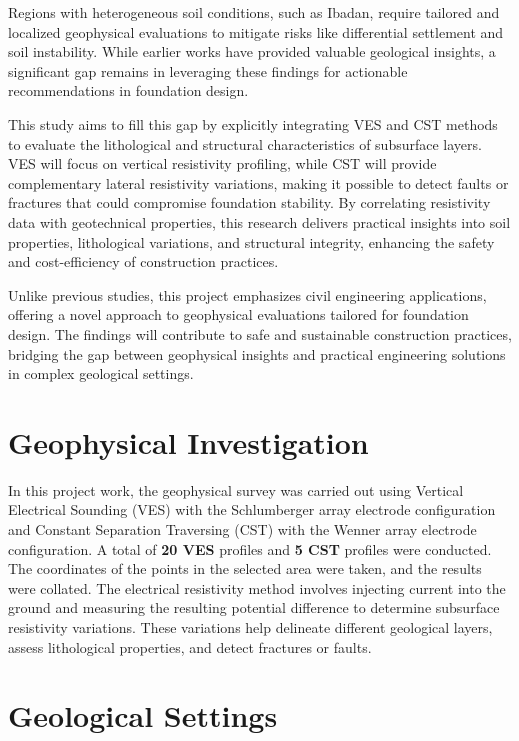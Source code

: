 \documentclass[12pt,a4paper]{report}
\begin{document}
Regions with heterogeneous soil conditions, such as Ibadan, require tailored and localized geophysical evaluations to mitigate risks like differential settlement and soil instability. While earlier works have provided valuable geological insights, a significant gap remains in leveraging these findings for actionable recommendations in foundation design.

This study aims to fill this gap by explicitly integrating VES and CST methods to evaluate the lithological and structural characteristics of subsurface layers. VES will focus on vertical resistivity profiling, while CST will provide complementary lateral resistivity variations, making it possible to detect faults or fractures that could compromise foundation stability. By correlating resistivity data with geotechnical properties, this research delivers practical insights into soil properties, lithological variations, and structural integrity, enhancing the safety and cost-efficiency of construction practices.

Unlike previous studies, this project emphasizes civil engineering applications, offering a novel approach to geophysical evaluations tailored for foundation design. The findings will contribute to safe and sustainable construction practices, bridging the gap between geophysical insights and practical engineering solutions in complex geological settings.

\section{Geophysical Investigation}
In this project work, the geophysical survey was carried out using Vertical Electrical Sounding (VES) with the Schlumberger array electrode configuration and Constant Separation Traversing (CST) with the Wenner array electrode configuration. A total of \textbf{20 VES} profiles and \textbf{5 CST} profiles were conducted. The coordinates of the points in the selected area were taken, and the results were collated. The electrical resistivity method involves injecting current into the ground and measuring the resulting potential difference to determine subsurface resistivity variations. These variations help delineate different geological layers, assess lithological properties, and detect fractures or faults.

\section{Geological Settings}
\end{document}
